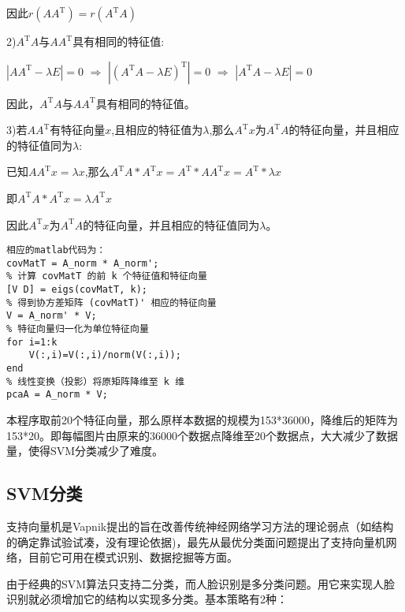 \documentclass[a4paper,12pt]{ctexart}
\begin{document}
因此$r(AA^\mathrm{T})=r(A^\mathrm{T}A)$
\newline

2)$A^\mathrm{T}A$与$AA^\mathrm{T}$具有相同的特征值:

$\left| AA^\mathrm{T}-\lambda E  \right|=0$ \quad $\Longrightarrow$   $\left| (A^\mathrm{T}A-\lambda E)^\mathrm{T}  \right|=0$
\quad $\Longrightarrow$  $\left| A^\mathrm{T}A-\lambda E  \right|= 0$

因此，$A^\mathrm{T}A$与$AA^\mathrm{T}$具有相同的特征值。
 \quad
 \newline
 
 3)若$AA^\mathrm{T}$有特征向量$x$,且相应的特征值为$\lambda$,那么$A^\mathrm{T}x$为$A^\mathrm{T}A$的特征向量，并且相应的特征值同为$\lambda$:

 已知$AA^\mathrm{T}x=\lambda x$,那么$A^\mathrm{T}A*A^\mathrm{T}x=A^\mathrm{T}*AA^\mathrm{T}x=A^\mathrm{T}*\lambda x$

 即$A^\mathrm{T}A*A^\mathrm{T}x=\lambda A^\mathrm{T} x$

 因此$A^\mathrm{T}x$为$A^\mathrm{T}A$的特征向量，并且相应的特征值同为$\lambda$。
 
\begin{lstlisting}
相应的matlab代码为：
covMatT = A_norm * A_norm';
% 计算 covMatT 的前 k 个特征值和特征向量
[V D] = eigs(covMatT, k);
% 得到协方差矩阵 (covMatT)' 相应的特征向量
V = A_norm' * V;
% 特征向量归一化为单位特征向量
for i=1:k
    V(:,i)=V(:,i)/norm(V(:,i));
end
% 线性变换（投影）将原矩阵降维至 k 维
pcaA = A_norm * V;
 \end{lstlisting}
 本程序取前20个特征向量，那么原样本数据的规模为153*36000，降维后的矩阵为153*20。即每幅图片由原来的36000个数据点降维至20个数据点，大大减少了数据量，使得SVM分类减少了难度。

 
 \subsection{SVM分类}
 支持向量机是Vapnik提出的旨在改善传统神经网络学习方法的理论弱点（如结构的确定靠试验试凑，没有理论依据)，最先从最优分类面问题提出了支持向量机网络，目前它可用在模式识别、数据挖掘等方面。

 由于经典的SVM算法只支持二分类，而人脸识别是多分类问题。用它来实现人脸识别就必须增加它的结构以实现多分类。基本策略有2种：
\end{document}
